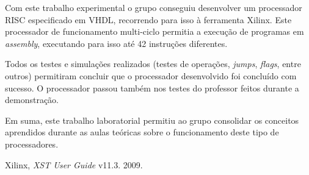 \documentclass[a4paper]{article}
\begin{document}
		Com este trabalho experimental o grupo conseguiu desenvolver um processador \textmu RISC especificado em VHDL, recorrendo para isso à ferramenta Xilinx. Este processador de funcionamento multi-ciclo permitia a execução de programas em \textit{assembly}, executando para isso até 42 instruções diferentes.
		
		Todos os testes e simulações realizados (testes de operações, \textit{jumps}, \textit{flags}, entre outros) permitiram concluir que o processador desenvolvido foi concluído com sucesso. O processador passou também nos testes do professor feitos durante a demonstração.
		
		Em suma, este trabalho laboratorial permitiu ao grupo consolidar os conceitos aprendidos durante as aulas teóricas sobre o funcionamento deste tipo de processadores.


	
	
	\begin{thebibliography}{13}
		Xilinx\textregistered,
		\emph{XST User Guide} v11.3.
		2009.
	\end{thebibliography}
\end{document}
